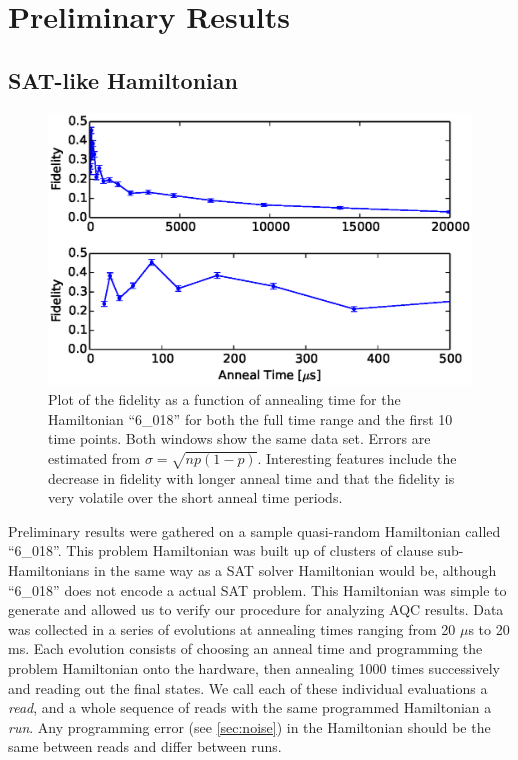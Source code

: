 \chapter{Preliminary Results}
\label{chap:prelim}

\section{SAT-like Hamiltonian}
\begin{figure}[h]
	\includegraphics{img/6_018_2_fidelity.eps}
	\caption[Fidelity vs Time]{Plot of the fidelity as a function of annealing time for the Hamiltonian ``6\_018'' for both the full time range and the first 10 time points.  Both windows show the same data set.  Errors are estimated from $\sigma = \sqrt{np(1-p)}$.  Interesting features include the decrease in fidelity with longer anneal time and that the fidelity is very volatile over the short anneal time periods.}
	\label{fig:fidelity}
\end{figure}

Preliminary results were gathered on a sample quasi-random Hamiltonian called ``6\_018''.  This problem Hamiltonian was built up of clusters of clause sub-Hamiltonians in the same way as a SAT solver Hamiltonian would be, although ``6\_018'' does not encode a actual SAT problem.  This Hamiltonian was simple to generate and allowed us to verify our procedure for analyzing AQC results.
Data was collected in a series of evolutions at annealing times ranging from 20 $\mu$s to 20 ms.  Each evolution consists of choosing an anneal time and programming the problem Hamiltonian onto the hardware, then annealing 1000 times successively and reading out the final states.  We call each of these individual evaluations a \emph{read}, and a whole sequence of reads with the same programmed Hamiltonian a \emph{run}.  Any programming error (see \ref{sec:noise}) in the Hamiltonian should be the same between reads and differ between runs.

